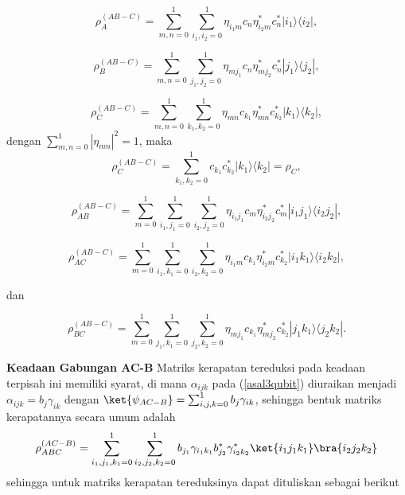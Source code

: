 \begin{equation}
\rho_{A}^{(AB-C)} = \sum_{m,n=0}^{1}\sum_{i_1,i_2=0}^{1} \eta_{i_1 m}c_n \eta^{*}_{i_2 m}c^{*}_n|i_1\rangle \langle i_2|,
\end{equation}

\begin{equation}
\rho_{B}^{(AB-C)} = \sum_{m,n=0}^{1}\sum_{j_1,j_2=0}^{1} \eta_{m j_1}c_n\eta^{*}_{m j_2}c^{*}_n|j_1\rangle \langle j_2|,
\end{equation}

\begin{equation}
\rho_{C}^{(AB-C)} = \sum_{m,n=0}^{1}\sum_{k_1,k_2=0}^{1}\eta_{mn} c_{k_1}\eta^{*}_{mn} c^{*}_{k_2}|k_1\rangle \langle k_2|,
\end{equation}
dengan $\sum_{m,n=0}^{1}|\eta_{mn}|^2=1$, maka
\begin{equation}
	\rho_{C}^{(AB-C)} = \sum_{k_1,k_2=0}^{1} c_{k_1} c^{*}_{k_2}|k_1\rangle \langle k_2|=\rho_C,
\end{equation}

\begin{equation}
\rho_{AB}^{(AB-C)} = \sum_{m=0}^{1} \sum_{i_1,j_1=0}^{1}\sum_{i_2,j_2=0}^{1} \eta_{i_1j_1}c_m \eta^{*}_{i_2j_2}c^{*}_m |i_1 j_1\rangle \langle i_2 j_2|,
\end{equation}

\begin{equation}
\rho_{AC}^{(AB-C)} = \sum_{m=0}^{1} \sum_{i_1,k_1=0}^{1}\sum_{i_2,k_2=0}^{1} \eta_{i_1 m} c_{k_1}\eta^{*}_{i_2 m} c^{*}_{k_2}|i_1 k_1\rangle \langle i_2 k_2|,
\end{equation}

dan

\begin{equation}
\rho_{BC}^{(AB-C)} = \sum_{m=0}^{1} \sum_{j_1,k_1=0}^{1}\sum_{j_2,k_2=0}^{1} \eta_{m j_1} c_{k_1}\eta^{*}_{m j_2} c^{*}_{k_2}|j_1 k_1\rangle \langle j_2 k_2|.
\end{equation}


\textbf{Keadaan Gabungan AC-B}
Matriks kerapatan tereduksi pada keadaan terpisah ini memiliki syarat, di mana $\alpha_{ijk}$ pada (\ref{asal3qubit}) diuraikan menjadi $\alpha_{ijk}=b_j\gamma_{ik}$ dengan $\ket{\psi_{AC-B}}=\sum_{i,j,k=0}^1 b_j\gamma_{ik}$, sehingga bentuk matriks kerapatannya secara umum adalah
\begin{equation}
    \rho_{ABC}^{(AC-B)}=\sum_{i_1,j_1,k_1=0}^1\sum_{i_2,j_2,k_2=0}^1 b_{j_1}\gamma_{i_1k_1}b^{*}_{j_2}\gamma^{*}_{i_2k_2}\ket{i_1j_1k_1}\bra{i_2j_2k_2}
\end{equation}
sehingga untuk matriks kerapatan tereduksinya dapat dituliskan sebagai berikut

